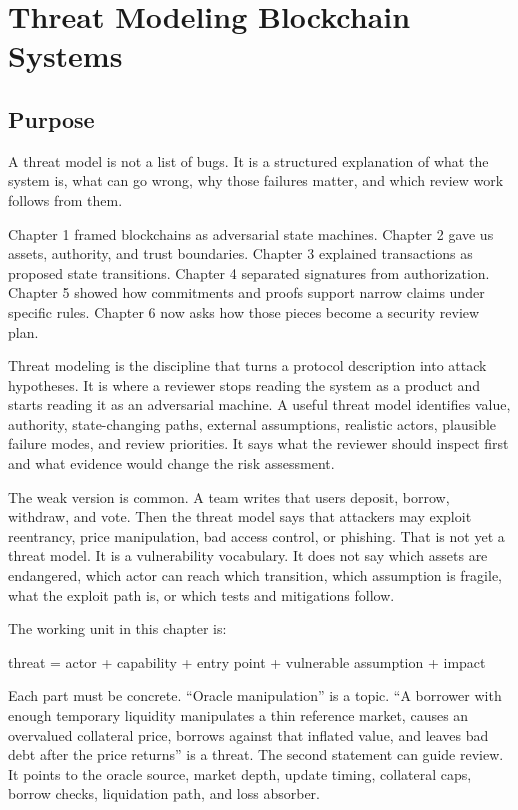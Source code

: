 \chapter{Threat Modeling Blockchain Systems}

\section{Purpose}

\begin{principlebox}
A threat model is not a list of bugs. It is a structured explanation of what the system is, what can go wrong, why those failures matter, and which review work follows from them.
\end{principlebox}

Chapter 1 framed blockchains as adversarial state machines. Chapter 2 gave us assets, authority, and trust boundaries. Chapter 3 explained transactions as proposed state transitions. Chapter 4 separated signatures from authorization. Chapter 5 showed how commitments and proofs support narrow claims under specific rules. Chapter 6 now asks how those pieces become a security review plan.

Threat modeling is the discipline that turns a protocol description into attack hypotheses. It is where a reviewer stops reading the system as a product and starts reading it as an adversarial machine. A useful threat model identifies value, authority, state-changing paths, external assumptions, realistic actors, plausible failure modes, and review priorities. It says what the reviewer should inspect first and what evidence would change the risk assessment.

The weak version is common. A team writes that users deposit, borrow, withdraw, and vote. Then the threat model says that attackers may exploit reentrancy, price manipulation, bad access control, or phishing. That is not yet a threat model. It is a vulnerability vocabulary. It does not say which assets are endangered, which actor can reach which transition, which assumption is fragile, what the exploit path is, or which tests and mitigations follow.

The working unit in this chapter is:

\begin{codeblock}
threat =
    actor
  + capability
  + entry point
  + vulnerable assumption
  + impact
\end{codeblock}

Each part must be concrete. ``Oracle manipulation'' is a topic. ``A borrower with enough temporary liquidity manipulates a thin reference market, causes an overvalued collateral price, borrows against that inflated value, and leaves bad debt after the price returns'' is a threat. The second statement can guide review. It points to the oracle source, market depth, update timing, collateral caps, borrow checks, liquidation path, and loss absorber.

